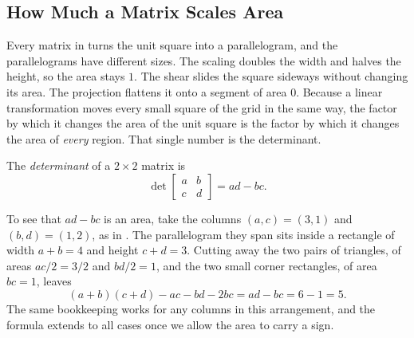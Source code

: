 \subsection{How Much a Matrix Scales Area}
\label{sec:ch03-det-area}

Every matrix in  turns the unit square into a
parallelogram, and the parallelograms have different sizes. The scaling
doubles the width and halves the height, so the area stays $1$. The shear
slides the square sideways without changing its area. The projection
flattens it onto a segment of area $0$. Because a linear transformation
moves every small square of the grid in the same way, the factor by which
it changes the area of the unit square is the factor by which it changes
the area of \emph{every} region. That single number is the determinant.

\begin{definition}
  \label{def:det-2x2}
  The \emph{determinant} of a $2 \times 2$ matrix is
  \[
    \det \begin{bmatrix} a & b \\ c & d \end{bmatrix} = ad - bc .
  \]
\end{definition}

To see that $ad - bc$ is an area, take the columns $(a, c) = (3, 1)$ and
$(b, d) = (1, 2)$, as in . The parallelogram they
span sits inside a rectangle of width $a + b = 4$ and height
$c + d = 3$. Cutting away the two pairs of triangles, of areas
$ac/2 = 3/2$ and $bd/2 = 1$, and the two small corner rectangles, of
area $bc = 1$, leaves
\[
  (a + b)(c + d) - ac - bd - 2bc = ad - bc = 6 - 1 = 5 .
\]
The same bookkeeping works for any columns in this arrangement, and
the formula extends to all cases once we allow the area to carry a sign.

